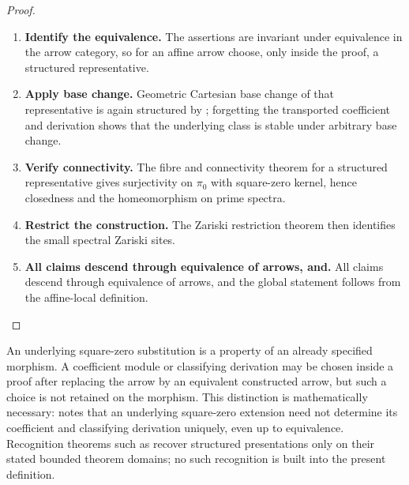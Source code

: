 \begin{proof}
\leavevmode
\begin{enumerate}[label=\textup{(\arabic*)}]
    \item \textbf{Identify the equivalence.}
    The assertions are invariant under equivalence in the arrow category, so for an affine arrow
    choose, only inside the proof, a structured representative.

    \item \textbf{Apply base change.}
    Geometric Cartesian base change of that representative is again structured by
    ; forgetting the transported
    coefficient and derivation shows that the underlying class is stable under arbitrary base
    change.

    \item \textbf{Verify connectivity.}
    The fibre and connectivity theorem for a structured representative gives surjectivity on
    \(\pi_0\) with square-zero kernel, hence closedness and the homeomorphism on prime
    spectra.

    \item \textbf{Restrict the construction.}
    The Zariski restriction theorem then identifies the small spectral Zariski sites.

    \item \textbf{All claims descend through equivalence of arrows, and.}
    All claims descend through equivalence of arrows, and the global statement follows from the
    affine-local definition.
\end{enumerate}
\end{proof}

\begin{remark}
\label{rem:no-square-zero-presentation-datum}
An underlying square-zero substitution is a property of an already specified
morphism. A coefficient module or classifying derivation may be chosen inside
a proof after replacing the arrow by an equivalent constructed arrow, but such
a choice is not retained on the morphism. This distinction is mathematically
necessary: \cite[Warning~3.9]{LurieDAGIV} notes that an underlying square-zero
extension need not determine its coefficient and classifying derivation
uniquely, even up to equivalence. Recognition theorems such as
\cite[Theorem~3.17]{LurieDAGIV} recover structured presentations only on their
stated bounded theorem domains; no such recognition is built into the present
definition.
\end{remark}

